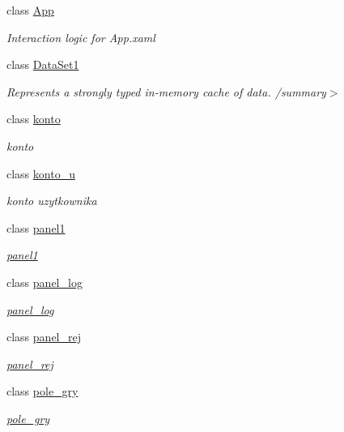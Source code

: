 \begin{DoxyCompactItemize}
\item 
class \mbox{\hyperlink{classprojekt_1_1_app}{App}}
\begin{DoxyCompactList}\small\item\em Interaction logic for App.\+xaml \end{DoxyCompactList}\item 
class \mbox{\hyperlink{classprojekt_1_1_data_set1}{Data\+Set1}}
\begin{DoxyCompactList}\small\item\em Represents a strongly typed in-\/memory cache of data. /summary$>$ \end{DoxyCompactList}\item 
class \mbox{\hyperlink{classprojekt_1_1konto}{konto}}
\begin{DoxyCompactList}\small\item\em konto \end{DoxyCompactList}\item 
class \mbox{\hyperlink{classprojekt_1_1konto__u}{konto\+\_\+u}}
\begin{DoxyCompactList}\small\item\em konto uzytkownika \end{DoxyCompactList}\item 
class \mbox{\hyperlink{classprojekt_1_1panel1}{panel1}}
\begin{DoxyCompactList}\small\item\em \mbox{\hyperlink{classprojekt_1_1panel1}{panel1}} \end{DoxyCompactList}\item 
class \mbox{\hyperlink{classprojekt_1_1panel__log}{panel\+\_\+log}}
\begin{DoxyCompactList}\small\item\em \mbox{\hyperlink{classprojekt_1_1panel__log}{panel\+\_\+log}} \end{DoxyCompactList}\item 
class \mbox{\hyperlink{classprojekt_1_1panel__rej}{panel\+\_\+rej}}
\begin{DoxyCompactList}\small\item\em \mbox{\hyperlink{classprojekt_1_1panel__rej}{panel\+\_\+rej}} \end{DoxyCompactList}\item 
class \mbox{\hyperlink{classprojekt_1_1pole__gry}{pole\+\_\+gry}}
\begin{DoxyCompactList}\small\item\em \mbox{\hyperlink{classprojekt_1_1pole__gry}{pole\+\_\+gry}} \end{DoxyCompactList}\item 

\end{DoxyCompactItemize}
